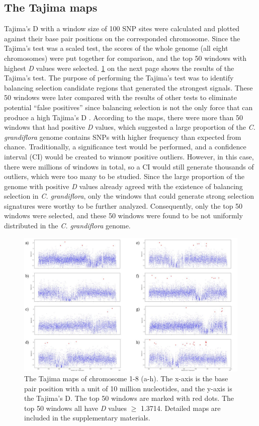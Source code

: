 \subsection{The Tajima maps}
Tajima’s D with a window size of 100 SNP sites were calculated and plotted against their base pair positions on the corresponded chromosome. Since the Tajima’s test was a scaled test, the scores of the whole genome (all eight chromosomes) were put together for comparison, and the top 50 windows with highest \emph{D} values were selected. \cref{fig:1} on the next page shows the results of the Tajima’s test. The purpose of performing the Tajima’s test was to identify balancing selection candidate regions that generated the strongest signals. These 50 windows were later compared with the results of other tests to eliminate potential “false positives” since balancing selection is not the only force that can produce a high Tajima’s D \citep{RN12}. According to the maps, there were more than 50 windows that had positive \emph{D} values, which suggested a large proportion of the \emph{C. grandiflora} genome contains SNPs with higher frequency than expected from chance. Traditionally, a significance test would be performed, and a confidence interval (CI) would be created to winnow positive outliers. However, in this case, there were millions of windows in total, so a CI would still generate thousands of outliers, which were too many to be studied. Since the large proportion of the genome with positive \emph{D} values already agreed with the existence of balancing selection in \emph{C. grandiflora}, only the windows that could generate strong selection signatures were worthy to be further analyzed. Consequently, only the top 50 windows were selected, and these 50 windows were found to be not uniformly distributed in the \emph{C. grandiflora} genome.

\begin{figure}[h!]
    \centering
    \includegraphics[scale=0.7]{figs/1.JPG}
    \caption{The Tajima maps of chromosome 1-8 (a-h). The x-axis is the base pair position with a unit of 10 million nucleotides, and the y-axis is the Tajima’s D. The top 50 windows are marked with red dots. The top 50 windows all have \emph{D} values $\geq$ 1.3714. Detailed maps are included in the supplementary materials.}
    \label{fig:1}
\end{figure}


